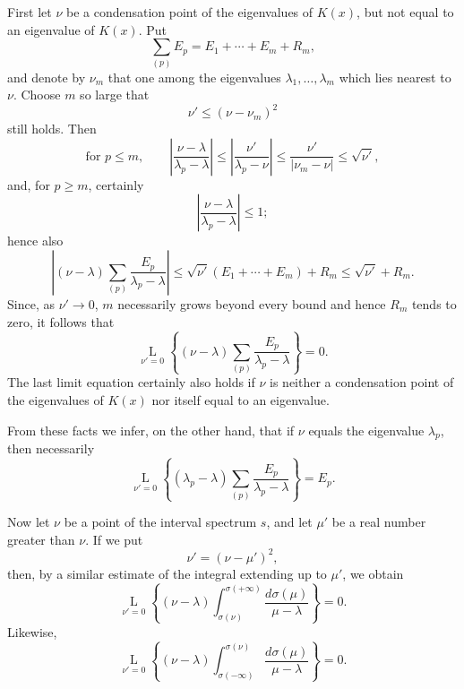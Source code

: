\documentclass[b5paper,twoside]{article}
\newcommand{\originalpage}[1]{\phantomsection\label{origpage:#1}}
\begin{document}
\originalpage{191}
First let $\nu$ be a condensation point of the eigenvalues of $K(x)$, but not
equal to an eigenvalue of $K(x)$.  Put
\[
  \sum_{(p)}E_p=E_1+\cdots+E_m+R_m,
\]
and denote by $\nu_m$ that one among the eigenvalues
$\lambda_1,\ldots,\lambda_m$ which lies nearest to $\nu$.  Choose $m$ so
large that
\[
  \nu'\le(\nu-\nu_m)^2
\]
still holds.
Then
\[
  \text{for }p\le m,\qquad
  \left\lvert\frac{\nu-\lambda}{\lambda_p-\lambda}\right\rvert
  \le\left\lvert\frac{\nu'}{\lambda_p-\nu}\right\rvert
  \le\frac{\nu'}{\lvert\nu_m-\nu\rvert}
  \le\sqrt{\nu'},
\]
and, for $p\ge m$, certainly
\[
  \left\lvert\frac{\nu-\lambda}{\lambda_p-\lambda}\right\rvert\le1;
\]
hence also
\[
  \left\lvert
    (\nu-\lambda)\sum_{(p)}\frac{E_p}{\lambda_p-\lambda}
  \right\rvert
  \le\sqrt{\nu'}(E_1+\cdots+E_m)+R_m
  \le\sqrt{\nu'}+R_m.
\]
Since, as $\nu'\to0$, $m$ necessarily grows beyond every bound and hence
$R_m$ tends to zero, it follows that
\begin{equation}
\tag{64}\label{eq:64}
  \mathop{\mathrm{L}}\limits_{\nu'=0}
  \left\{(\nu-\lambda)
  \sum_{(p)}\frac{E_p}{\lambda_p-\lambda}\right\}=0.
\end{equation}
The last limit equation certainly also holds if $\nu$ is neither a
condensation point of the eigenvalues of $K(x)$ nor itself equal to an
eigenvalue.

From these facts we infer, on the other hand, that if $\nu$ equals the
eigenvalue $\lambda_p$, then necessarily
\begin{equation}
\tag{65}\label{eq:65}
  \mathop{\mathrm{L}}\limits_{\nu'=0}
  \left\{(\lambda_p-\lambda)
  \sum_{(p)}\frac{E_p}{\lambda_p-\lambda}\right\}=E_p.
\end{equation}

Now let $\nu$ be a point of the interval spectrum $s$, and let $\mu'$ be a
real number greater than $\nu$.  If we put
\[
  \nu'=(\nu-\mu')^2,
\]
then, by a similar estimate of the integral extending up to $\mu'$, we obtain
\begin{equation}
\tag{66}\label{eq:66}
  \mathop{\mathrm{L}}\limits_{\nu'=0}
  \left\{(\nu-\lambda)
  \int_{\sigma(\nu)}^{\sigma(+\infty)}
  \frac{d\sigma(\mu)}{\mu-\lambda}\right\}=0.
\end{equation}
Likewise,
\begin{equation}
\tag{67}\label{eq:67}
  \mathop{\mathrm{L}}\limits_{\nu'=0}
  \left\{(\nu-\lambda)
  \int_{\sigma(-\infty)}^{\sigma(\nu)}
  \frac{d\sigma(\mu)}{\mu-\lambda}\right\}=0.
\end{equation}
\end{document}
